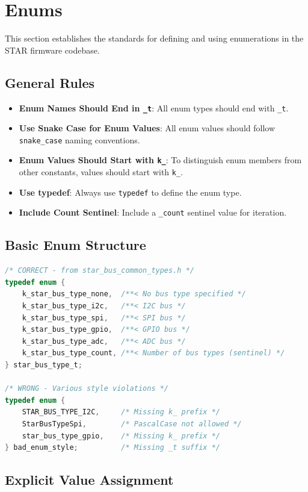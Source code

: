 \section{Enums}

This section establishes the standards for defining and using enumerations in the STAR firmware codebase.

\subsection{General Rules}

\begin{itemize}
    \item \textbf{Enum Names Should End in \texttt{\_t}}: All enum types should end with \texttt{\_t}.
    \item \textbf{Use Snake Case for Enum Values}: All enum values should follow \texttt{snake\_case} naming conventions.
    \item \textbf{Enum Values Should Start with \texttt{k\_}}: To distinguish enum members from other constants, values should start with \texttt{k\_}.
    \item \textbf{Use typedef}: Always use \texttt{typedef} to define the enum type.
    \item \textbf{Include Count Sentinel}: Include a \texttt{\_count} sentinel value for iteration.
\end{itemize}

\subsection{Basic Enum Structure}

\begin{lstlisting}[language=C]
/* CORRECT - from star_bus_common_types.h */
typedef enum {
    k_star_bus_type_none,  /**< No bus type specified */
    k_star_bus_type_i2c,   /**< I2C bus */
    k_star_bus_type_spi,   /**< SPI bus */
    k_star_bus_type_gpio,  /**< GPIO bus */
    k_star_bus_type_adc,   /**< ADC bus */
    k_star_bus_type_count, /**< Number of bus types (sentinel) */
} star_bus_type_t;

/* WRONG - Various style violations */
typedef enum {
    STAR_BUS_TYPE_I2C,     /* Missing k_ prefix */
    StarBusTypeSpi,        /* PascalCase not allowed */
    star_bus_type_gpio,    /* Missing k_ prefix */
} bad_enum_style;          /* Missing _t suffix */
\end{lstlisting}

\subsection{Explicit Value Assignment}

